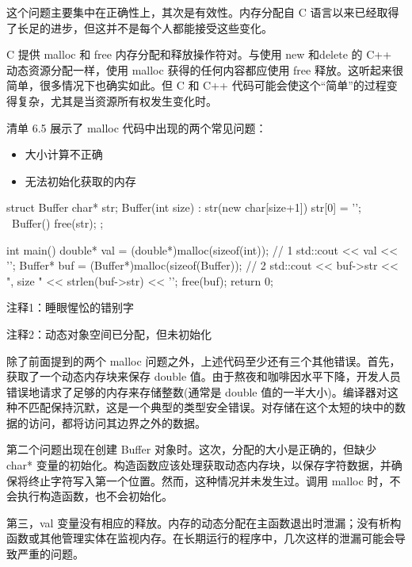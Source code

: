 这个问题主要集中在正确性上，其次是有效性。内存分配自 C 语言以来已经取得了长足的进步，但这并不是每个人都能接受这些变化。


C 提供 malloc 和 free 内存分配和释放操作符对。与使用 new 和delete 的 C++ 动态资源分配一样，使用 malloc 获得的任何内容都应使用 free 释放。这听起来很简单，很多情况下也确实如此。但 C 和 C++ 代码可能会使这个“简单”的过程变得复杂，尤其是当资源所有权发生变化时。

清单 6.5 展示了 malloc 代码中出现的两个常见问题：

\begin{itemize}
\item
大小计算不正确

\item
无法初始化获取的内存
\end{itemize}


\begin{cpp}
struct Buffer {
  char* str;
  Buffer(int size) : str(new char[size+1]) { str[0] = '\0'; }
  ~Buffer() { free(str); }
};

int main() {
  double* val = (double*)malloc(sizeof(int)); // 1
  std::cout << val << '\n';
  Buffer* buf = (Buffer*)malloc(sizeof(Buffer)); // 2
  std::cout << buf->str << ", size " << strlen(buf->str) << '\n';
  free(buf);
  return 0;
}
\end{cpp}

{\footnotesize
注释1：睡眼惺忪的错别字

注释2：动态对象空间已分配，但未初始化
}


除了前面提到的两个 malloc 问题之外，上述代码至少还有三个其他错误。首先，获取了一个动态内存块来保存 double 值。由于熬夜和咖啡因水平下降，开发人员错误地请求了足够的内存来存储整数(通常是 double 值的一半大小)。编译器对这种不匹配保持沉默，这是一个典型的类型安全错误。对存储在这个太短的块中的数据的访问，都将访问其边界之外的数据。

第二个问题出现在创建 Buffer 对象时。这次，分配的大小是正确的，但缺少 char* 变量的初始化。构造函数应该处理获取动态内存块，以保存字符数据，并确保将终止字符写入第一个位置。然而，这种情况并未发生过。调用 malloc 时，不会执行构造函数，也不会初始化。

第三，val 变量没有相应的释放。内存的动态分配在主函数退出时泄漏；没有析构函数或其他管理实体在监视内存。在长期运行的程序中，几次这样的泄漏可能会导致严重的问题。


